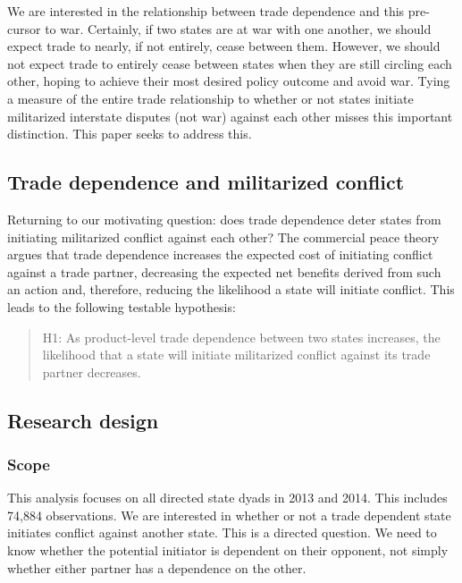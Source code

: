 \documentclass[
  letterpaper,
]{article}
\begin{document}
We are interested in the relationship between trade dependence and this
pre-cursor to war. Certainly, if two states are at war with one another,
we should expect trade to nearly, if not entirely, cease between them.
However, we should not expect trade to entirely cease between states
when they are still circling each other, hoping to achieve their most
desired policy outcome and avoid war. Tying a measure of the entire
trade relationship to whether or not states initiate militarized
interstate disputes (not war) against each other misses this important
distinction. This paper seeks to address this.

\hypertarget{trade-dependence-and-militarized-conflict}{%
\subsection{Trade dependence and militarized
conflict}\label{trade-dependence-and-militarized-conflict}}

Returning to our motivating question: does trade dependence deter states
from initiating militarized conflict against each other? The commercial
peace theory argues that trade dependence increases the expected cost of
initiating conflict against a trade partner, decreasing the expected net
benefits derived from such an action and, therefore, reducing the
likelihood a state will initiate conflict. This leads to the following
testable hypothesis:

\begin{quote}
H1: As product-level trade dependence between two states increases, the
likelihood that a state will initiate militarized conflict against its
trade partner decreases.
\end{quote}

\hypertarget{research-design}{%
\subsection{Research design}\label{research-design}}

\hypertarget{scope}{%
\subsubsection{Scope}\label{scope}}

This analysis focuses on all directed state dyads in 2013 and 2014. This
includes 74,884 observations. We are interested in whether or not a
trade dependent state initiates conflict against another state. This is
a directed question. We need to know whether the potential initiator is
dependent on their opponent, not simply whether either partner has a
dependence on the other.
\end{document}

